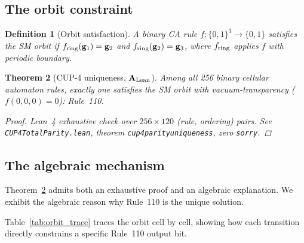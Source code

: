 \documentclass[11pt]{article}
\newtheorem{theorem}{Theorem}[section]
\newtheorem{definition}[theorem]{Definition}
\theoremstyle{remark}
\newcommand{\lean}[1]{%
  \penalty-100
  \begingroup\def\_{\textunderscore\allowbreak}\texttt{#1}\endgroup}
\newcommand{\CatAL}{\ensuremath{\textbf{A}_{\rm Lean}}}
\begin{document}
\subsection{The orbit constraint}

\begin{definition}[Orbit satisfaction]
A binary CA rule $f:\{0,1\}^3 \to \{0,1\}$ \emph{satisfies the SM orbit} if
$f_{\rm ring}(\mathbf{g}_1) = \mathbf{g}_2$ and $f_{\rm ring}(\mathbf{g}_2) = \mathbf{g}_3$,
where $f_{\rm ring}$ applies $f$ with periodic boundary.
\end{definition}

\begin{theorem}[CUP-4 uniqueness, $\CatAL$]
\label{thm:cup4}
Among all 256 binary cellular automaton rules, exactly one satisfies the SM orbit
with vacuum-transparency ($f(0,0,0) = 0$): Rule~110.
\begin{proof}
Lean~4 exhaustive check over $256 \times 120$ (rule, ordering) pairs.
See \lean{CUP4TotalParity.lean}, theorem \lean{cup4\_parity\_uniqueness}, zero \texttt{sorry}.
\end{proof}
\end{theorem}

\subsection{The algebraic mechanism}

Theorem~\ref{thm:cup4} admits both an exhaustive proof and an algebraic explanation. We exhibit the
algebraic reason why Rule~110 is the unique solution.

Table~\ref{tab:orbit_trace} traces the orbit cell by cell, showing how each transition
directly constrains a specific Rule~110 output bit.
\end{document}

